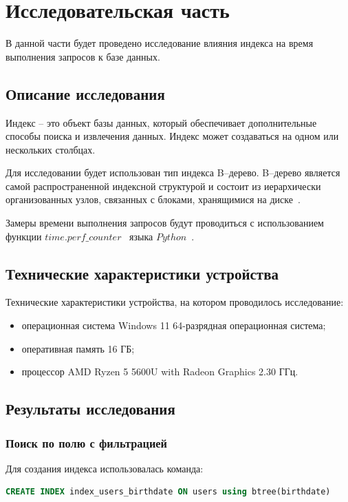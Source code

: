 \chapter{Исследовательская часть}
В данной части будет проведено исследование влияния индекса на время выполнения запросов к базе данных.

\section{Описание исследования}
Индекс -- это объект базы данных, который обеспечивает дополнительные способы поиска и извлечения данных. Индекс может создаваться на одном или нескольких столбцах. 

Для исследовании будет использован тип индекса B--дерево. B--дерево является самой распространенной индексной структурой и состоит из иерархически организованных узлов, связанных с блоками, хранящимися на диске~\cite{dombrovskaya}.


Замеры времени выполнения запросов будут проводиться с использованием функции $time.perf\_counter$~\cite{timeperf} языка $Python$~\cite{Python}.


\section{Технические характеристики устройства}
Технические характеристики устройства, на котором проводилось исследование:
\begin{itemize}
	\item операционная система Windows 11 64-разрядная операционная система;
	\item оперативная память 16 ГБ;
	\item процессор AMD Ryzen 5 5600U with Radeon Graphics 2.30 ГГц.
\end{itemize}


\section{Результаты исследования}
\subsection{Поиск по полю с фильтрацией}
Для создания индекса использовалась команда:
\begin{lstlisting}[language=SQL]
	CREATE INDEX index_users_birthdate ON users using btree(birthdate)
\end{lstlisting}


